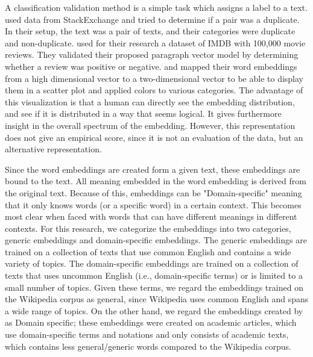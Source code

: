 \documentclass[../../Thesis.tex]{subfiles}
\begin{document}
\begin{jumpin}
A classification validation method is a simple task which assigns a label to a text. \citet{lau2016empirical} used data from StackExchange and tried to determine if a pair was a duplicate. In their setup, the text was a pair of texts, and their categories were duplicate and non-duplicate. \citet{le2014distributed} used for their research a dataset of IMDB with 100,000 movie reviews. They validated their proposed paragraph vector model by determining whether a review was positive or negative.
\citet{dai2015document} and \citet{hinton2003stochastic} mapped their word embeddings from a high dimensional vector to a two-dimensional vector to be able to display them in a scatter plot and applied colors to various categories. The advantage of this visualization is that a human can directly see the embedding distribution, and see if it is distributed in a way that seems logical. It gives furthermore insight in the overall spectrum of the embedding. However, this representation does not give an empirical score, since it is not an evaluation of the data, but an alternative representation. 
\end{jumpin}
Since the word embeddings are created form a given text, these embeddings are bound to the text. All meaning embedded in the word embedding is derived from the original text. Because of this, embeddings can be "Domain-specific" meaning that it only knows words (or a specific word) in a certain context. This becomes most clear when faced with words that can have different meanings in different contexts. For this research, we categorize the embeddings into two categories, generic embeddings and domain-specific embeddings. The generic embeddings are trained on a collection of texts that use common English and contains a wide variety of topics. The domain-specific embeddings are trained on a collection of texts that uses uncommon English (i.e., domain-specific terms) or is limited to a small number of topics. Given these terms, we regard the embeddings trained on the Wikipedia corpus\cite{lai2016generate, pennington2014glove, dai2015document, lau2016empirical, schnabel2015evaluation} as general, since Wikipedia uses common English and spans a wide range of topics. On the other hand, we regard the embeddings created by \citet{Truong2017Thesis} as Domain specific; these embeddings were created on academic articles, which use domain-specific terms and notations and only consists of academic texts, which contains less general/generic words compared to the Wikipedia corpus.
\end{document}
